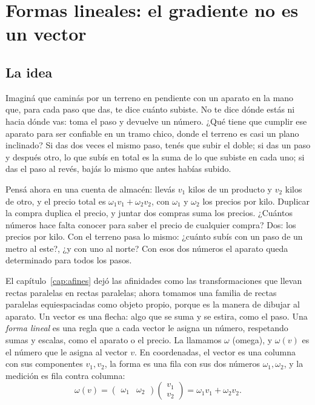 \chapter{Formas lineales: el gradiente no es un vector}\label{cap:formas-lineales}

\section{La idea}

Imaginá que caminás por un terreno en pendiente con un aparato en la mano que, para cada paso
que das, te dice cuánto subiste. No te dice dónde estás ni hacia dónde vas: toma el paso y
devuelve un número. ¿Qué tiene que cumplir ese aparato para ser confiable en un tramo chico,
donde el terreno es casi un plano inclinado? Si das dos veces el mismo paso, tenés que subir el
doble; si das un paso y después otro, lo que subís en total es la suma de lo que subiste en
cada uno; si das el paso al revés, bajás lo mismo que antes habías subido.

Pensá ahora en una cuenta de almacén: llevás \(v_1\) kilos de un producto y \(v_2\) kilos de
otro, y el precio total es \(\omega_1v_1+\omega_2v_2\), con \(\omega_1\) y \(\omega_2\) los
precios por kilo. Duplicar la compra duplica el precio, y juntar dos compras suma los precios.
¿Cuántos números hace falta conocer para saber el precio de cualquier compra? Dos: los precios
por kilo. Con el terreno pasa lo mismo: ¿cuánto subís con un paso de un metro al este?, ¿y con
uno al norte? Con esos dos números el aparato queda determinado para todos los pasos.

El capítulo~\ref{cap:afines} dejó las afinidades como las transformaciones que llevan rectas
paralelas en rectas paralelas; ahora tomamos una familia de rectas paralelas equiespaciadas
como objeto propio, porque es la manera de dibujar al aparato. Un vector es una flecha: algo
que se suma y se estira, como el paso. Una \emph{forma lineal} es una regla que a cada vector
le asigna un número, respetando sumas y escalas, como el aparato o el precio. La llamamos
\(\omega\) (omega), y \(\omega(v)\) es el número que le asigna al vector \(v\). En
coordenadas, el vector es una columna con sus componentes \(v_1,v_2\), la forma es una fila
con sus dos números \(\omega_1,\omega_2\), y la medición es fila contra columna:
\[
  \omega(v)=\begin{pmatrix}\omega_1&\omega_2\end{pmatrix}
  \begin{pmatrix}v_1\\v_2\end{pmatrix}=\omega_1v_1+\omega_2v_2 .
\]

